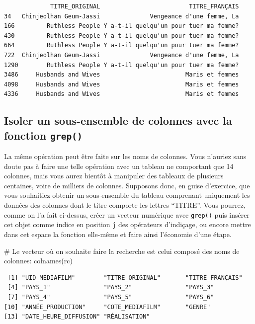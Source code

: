 \documentclass[
  letterpaper,
  DIV=11,
  numbers=noendperiod]{scrartcl}
\newenvironment{Shaded}{\begin{snugshade}}{\end{snugshade}}
\newcommand{\CommentTok}[1]{\textcolor[rgb]{0.37,0.37,0.37}{#1}}
\newcommand{\FunctionTok}[1]{\textcolor[rgb]{0.28,0.35,0.67}{#1}}
\newcommand{\NormalTok}[1]{\textcolor[rgb]{0.00,0.23,0.31}{#1}}
\begin{document}
\begin{verbatim}
             TITRE_ORIGINAL                         TITRE_FRANÇAIS
34   Chinjeolhan Geum-Jassi              Vengeance d'une femme, La
166         Ruthless People Y a-t-il quelqu'un pour tuer ma femme?
430         Ruthless People Y a-t-il quelqu'un pour tuer ma femme?
664         Ruthless People Y a-t-il quelqu'un pour tuer ma femme?
722  Chinjeolhan Geum-Jassi              Vengeance d'une femme, La
1290        Ruthless People Y a-t-il quelqu'un pour tuer ma femme?
3486     Husbands and Wives                        Maris et femmes
4098     Husbands and Wives                        Maris et femmes
4336     Husbands and Wives                        Maris et femmes
\end{verbatim}

\hypertarget{isoler-un-sous-ensemble-de-colonnes-avec-la-fonction-grep}{%
\subsection{\texorpdfstring{Isoler un sous-ensemble de colonnes avec la
fonction
\texttt{grep()}}{Isoler un sous-ensemble de colonnes avec la fonction grep()}}\label{isoler-un-sous-ensemble-de-colonnes-avec-la-fonction-grep}}

La même opération peut être faite sur les noms de colonnes. Vous
n'auriez sans doute pas à faire une telle opération avec un tableau ne
comportant que 14 colonnes, mais vous aurez bientôt à manipuler des
tableaux de plusieurs centaines, voire de milliers de colonnes.
Supposons donc, en guise d'exercice, que vous souhaitiez obtenir un
sous-ensemble du tableau comprenant uniquement les données des colonnes
dont le titre comporte les lettres ``TITRE''. Vous pourrez, comme on l'a
fait ci-dessus, créer un vecteur numérique avec \texttt{grep()} puis
insérer cet objet comme indice en position \texttt{j} des opérateurs
d'indiçage, ou encore mettre dans cet espace la fonction elle-même et
faire ainsi l'économie d'une étape.

\begin{Shaded}
\begin{Highlighting}[]
\CommentTok{\# Le vecteur où on souhaite faire la recherche est celui composé des noms de colonnes:}
\FunctionTok{colnames}\NormalTok{(rc)}
\end{Highlighting}
\end{Shaded}

\begin{verbatim}
 [1] "UID_MEDIAFILM"        "TITRE_ORIGINAL"       "TITRE_FRANÇAIS"      
 [4] "PAYS_1"               "PAYS_2"               "PAYS_3"              
 [7] "PAYS_4"               "PAYS_5"               "PAYS_6"              
[10] "ANNÉE_PRODUCTION"     "COTE_MEDIAFILM"       "GENRE"               
[13] "DATE_HEURE_DIFFUSION" "RÉALISATION"         
\end{verbatim}
\end{document}
